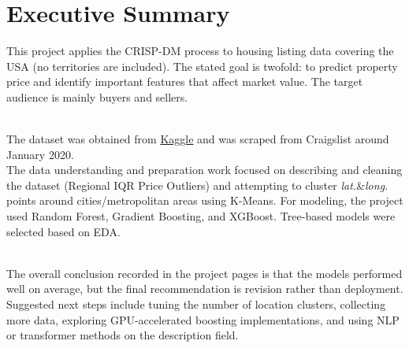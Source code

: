 \section*{Executive Summary}
\noindent
This project applies the CRISP-DM process to housing listing data covering the USA (no territories are included). The stated goal is twofold: to predict property price and %
identify important features that affect market value. %
The target audience is mainly buyers and sellers.

\\
\noindent
The dataset was obtained from \href{https://www.kaggle.com/datasets/austinreese/usa-housing-listings}{Kaggle} and was scraped from Craigslist around January 2020.\\
\noindent
The data understanding and preparation work focused on %
describing and cleaning the dataset (Regional IQR Price Outliers)
and attempting to cluster \textit{lat.}\&\textit{long.} points around cities/metropolitan areas using K-Means. %
For modeling, the project used Random Forest, Gradient Boosting, and XGBoost. Tree-based models were selected based on EDA.


\\
\noindent
The overall conclusion recorded in the project pages is that the models performed well on average, but the final recommendation is revision rather than deployment. Suggested next steps include tuning the number of location clusters, collecting more data, exploring GPU-accelerated boosting implementations, and using NLP or transformer methods on the description field. %


